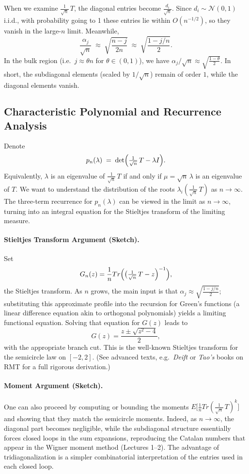 \documentclass[letterpaper,11pt,oneside,reqno]{article}
\numberwithin{equation}{section}
\theoremstyle{definition}
\begin{document}
When we examine $\frac{1}{\sqrt{n}}\,T$, the diagonal entries become $\frac{d_i}{\sqrt{n}}$. Since $d_i \sim \mathcal{N}(0,1)$ i.i.d., with probability going to 1 these entries lie within $O(n^{-1/2})$, so they vanish in the large-$n$ limit. Meanwhile,
\[
  \frac{\alpha_j}{\sqrt{n}}
  \;\approx\;
  \sqrt{\frac{n-j}{2n}}
  \;\approx\;
  \sqrt{\frac{1 - j/n}{2}}.
\]
In the bulk region (i.e.\ $j\approx \theta n$ for $\theta\in (0,1)$), we have $\alpha_j/\sqrt{n} \approx \sqrt{\frac{1-\theta}{2}}$. In short, the subdiagonal elements (scaled by $1/\sqrt{n}$) remain of order $1$, while the diagonal elements vanish.

\subsection{Characteristic Polynomial and Recurrence Analysis}

Denote
\[
  p_n(\lambda) \;=\;
  \det\Bigl(\tfrac1{\sqrt{n}}\,T - \lambda I\Bigr).
\]
Equivalently, $\lambda$ is an eigenvalue of $\frac{1}{\sqrt{n}}\,T$ if and only if $\mu = \sqrt{n}\,\lambda$ is an eigenvalue of $T$. We want to understand the distribution of the roots $\lambda_i(\frac{1}{\sqrt{n}}\,T)$ as $n\to\infty$. The three-term recurrence for $p_n(\lambda)$ can be viewed in the limit as $n\to\infty$, turning into an integral equation for the Stieltjes transform of the limiting measure.

\paragraph{Stieltjes Transform Argument (Sketch).}
Set
\[
  G_n(z)
  = \frac{1}{n}Tr\Bigl(\bigl(\tfrac{1}{\sqrt{n}}\,T - z\Bigr)^{-1}\Bigr),
\]
the Stieltjes transform. As $n$ grows, the main input is that $\alpha_j\approx \sqrt{\frac{1-j/n}{2}}$; substituting this approximate profile into the recursion for Green’s functions (a linear difference equation akin to orthogonal polynomials) yields a limiting functional equation. Solving that equation for $G(z)$ leads to
\[
  G(z) = \frac{z \pm \sqrt{z^2-4}}{2},
\]
with the appropriate branch cut. This is the well-known Stieltjes transform for the semicircle law on $[-2,2]$. (See advanced texts, e.g.\ \emph{Deift} or \emph{Tao’s} books on RMT for a full rigorous derivation.)

\paragraph{Moment Argument (Sketch).}
One can also proceed by computing or bounding the moments $ E\bigl[\frac{1}{n}Tr(\frac{1}{\sqrt{n}}\,T)^k\bigr]$ and showing that they match the semicircle moments. Indeed, as $n\to\infty$, the diagonal part becomes negligible, while the subdiagonal structure essentially forces closed loops in the sum expansions, reproducing the Catalan numbers that appear in the Wigner moment method (Lectures 1--2). The advantage of tridiagonalization is a simpler combinatorial interpretation of the entries used in each closed loop.
\end{document}
